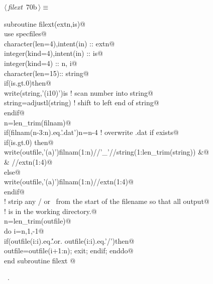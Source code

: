 \documentclass[10pt,a4paper,notitlepage]{article}
\begin{document}
\begin{flushleft} \small
\begin{minipage}{\linewidth}\label{scrap77}\raggedright\small
{} $\langle\,${\it filext}\nobreak\ {\footnotesize {70b}}$\,\rangle\equiv$
\vspace{-1ex}
\begin{list}{}{} \item
\mbox{}\verb@      subroutine filext(extn,is)@\\
\mbox{}\verb@      use specfiles@\\
\mbox{}\verb@      character(len=4),intent(in) :: extn@\\
\mbox{}\verb@      integer(kind=4),intent(in) :: is@\\
\mbox{}\verb@      integer(kind=4) :: n, i@\\
\mbox{}\verb@      character(len=15):: string@\\
\mbox{}\verb@      if(is.gt.0)then@\\
\mbox{}\verb@       write(string,'(i10)')is ! scan number into string@\\
\mbox{}\verb@       string=adjustl(string)  ! shift to left end of string@\\
\mbox{}\verb@      endif@\\
\mbox{}\verb@      n=len_trim(filnam)@\\
\mbox{}\verb@      if(filnam(n-3:n).eq.'.dat')n=n-4 ! overwrite .dat if exists@\\
\mbox{}\verb@      if(is.gt.0) then@\\
\mbox{}\verb@       write(outfile,'(a)')filnam(1:n)//'_'//string(1:len_trim(string)) &@\\
\mbox{}\verb@     & //extn(1:4)@\\
\mbox{}\verb@      else@\\
\mbox{}\verb@       write(outfile,'(a)')filnam(1:n)//extn(1:4)@\\
\mbox{}\verb@      endif@\\
\mbox{}\verb@! strip any / or \ from the start of the filename so that all output@\\
\mbox{}\verb@! is in the working directory.@\\
\mbox{}\verb@      n=len_trim(outfile)@\\
\mbox{}\verb@      do i=n,1,-1@\\
\mbox{}\verb@        if(outfile(i:i).eq.'\' .or. outfile(i:i).eq.'/')then@\\
\mbox{}\verb@        outfile=outfile(i+1:n); exit; endif; enddo@\\
\mbox{}\verb@      end subroutine filext                                                  @{\NWsep}
\end{list}
\vspace{-1.5ex}
\footnotesize
\begin{list}{}{\setlength{\itemsep}{-\parsep}\setlength{\itemindent}{-\leftmargin}}
\item \NWtxtMacroRefIn\ .

\item{}
\end{list}
\end{minipage}\vspace{4ex}
\end{flushleft}
\end{document}

